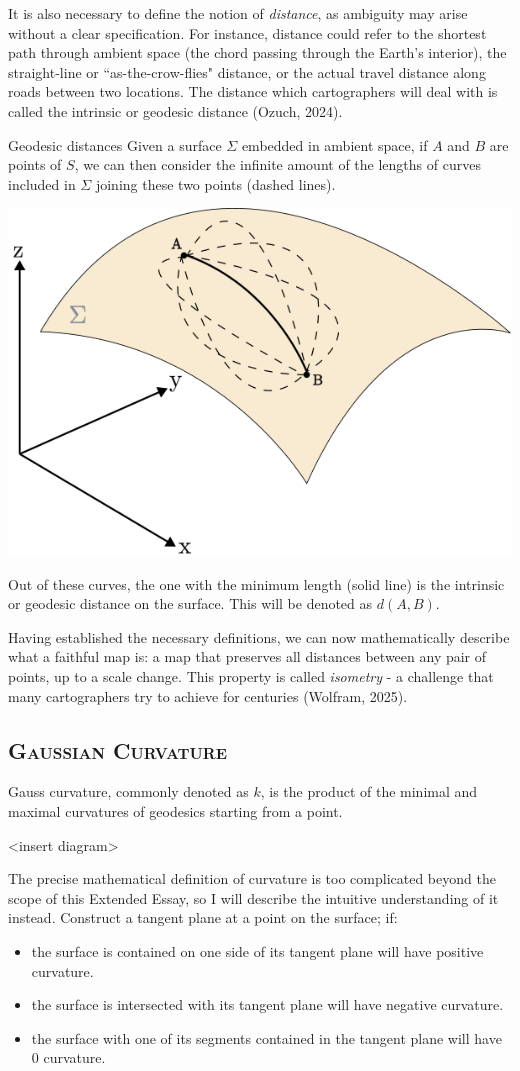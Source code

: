 It is also necessary to define the notion of \textit{distance}, as ambiguity may arise without a clear 
specification. For instance, distance could refer to the shortest path through ambient space (the chord 
passing through the Earth's interior), the straight-line or ``as-the-crow-flies" distance, or the actual travel 
distance along roads between two locations. The distance which cartographers will deal with is called the 
intrinsic or geodesic distance (Ozuch, 2024). 
\begin{definition}{Geodesic distances}
    Given a surface $\Sigma$ embedded in ambient space, if $A$ and $B$ are points of $S$, we can then consider 
    the infinite amount of the lengths of curves included in $\Sigma$ joining these two points (dashed lines). 
    \begin{center}
        \includegraphics[width=0.55\linewidth]
        {figures/distance.png}
    \end{center}
    Out of these curves, the one with the minimum length (solid line) is the intrinsic or geodesic distance on the surface. 
    This will be denoted as $d(A,B)$.
\end{definition}
Having established the necessary definitions, we can now mathematically describe what a faithful map is: a map that
preserves all distances between any pair of points, up to a scale change. This property is called \textit{isometry} 
- a challenge that many cartographers try to achieve for centuries (Wolfram, 2025). 

\pagebreak
\subsection{\textsc{Gaussian Curvature}}
\vspace*{-10pt}
Gauss curvature, commonly denoted as $k$, is the product of the minimal and maximal curvatures of geodesics starting from a point.

<insert diagram>

The precise mathematical definition of curvature is too complicated beyond the scope of this Extended Essay, so I will 
describe the intuitive understanding of it instead. Construct a tangent plane at a point on the surface; if:
\begin{itemize}
    \item the surface is contained on one side of its tangent plane will have positive curvature.
    \item the surface is intersected with its tangent plane will have negative curvature.
    \item the surface with one of its segments contained in the tangent plane will have 0 curvature. 
\end{itemize}

